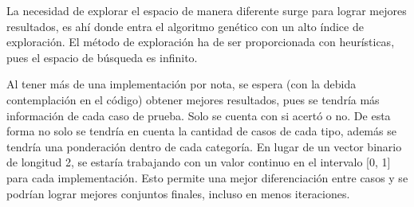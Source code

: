 \documentclass[a4paper,11pt]{article}
\begin{document}
		La necesidad de explorar el espacio de manera diferente surge para lograr mejores resultados, es ahí donde entra el algoritmo genético con un alto índice de exploración. El método de exploración ha de ser proporcionada con heurísticas, pues el espacio de búsqueda es infinito.
		
		Al tener más de una implementación por nota, se espera (con la debida contemplación en el código) obtener mejores resultados, pues se tendría más información de cada caso de prueba. Solo se cuenta con si acertó o no. De esta forma no solo se tendría en cuenta la cantidad de casos de cada tipo, además se tendría una ponderación dentro de cada categoría. En lugar de un vector binario de longitud 2, se estaría trabajando con un valor continuo en el intervalo [0, 1] para cada implementación. Esto permite una mejor diferenciación entre casos y se podrían lograr mejores conjuntos finales, incluso en menos iteraciones.
		
	
	
	
	
\end{document}
